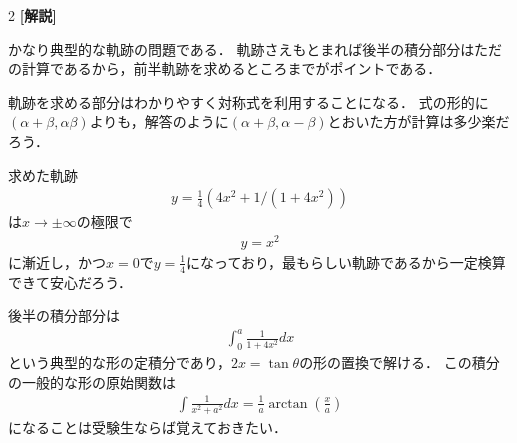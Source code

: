 \documentclass[../../main.tex]{subfiles}
\begin{document}
\begin{multicols}{2}
  {\bf[解説]}

  かなり典型的な軌跡の問題である．
  軌跡さえもとまれば後半の積分部分はただの計算であるから，前半軌跡を求めるところまでがポイントである．

  軌跡を求める部分はわかりやすく対称式を利用することになる．
  式の形的に$(\alpha+\beta,\alpha\beta)$よりも，解答のように$(\alpha+\beta,\alpha-\beta)$とおいた方が計算は多少楽だろう．

  求めた軌跡
  \begin{align*}
    y =  \frac{1}{4}\left(4x^2+1/(1+4x^2)\right)
  \end{align*}
  は$x\to\pm\infty$の極限で
  \begin{align*}
    y = x^2
  \end{align*}
  に漸近し，かつ$x=0$で$y=\frac{1}{4}$になっており，最もらしい軌跡であるから一定検算できて安心だろう．

  後半の積分部分は
  \begin{align*}
    \int_{0}^{a} \frac{1}{1+4x^2} dx
  \end{align*}
  という典型的な形の定積分であり，$2x=\tan\theta$の形の置換で解ける．
  この積分の一般的な形の原始関数は
  \begin{align*}
    \int \frac{1}{x^2+a^2} dx = \frac{1}{a} \arctan\left(\frac{x}{a}\right)
  \end{align*}
  になることは受験生ならば覚えておきたい．



  \newpage
\end{multicols}
\end{document}
